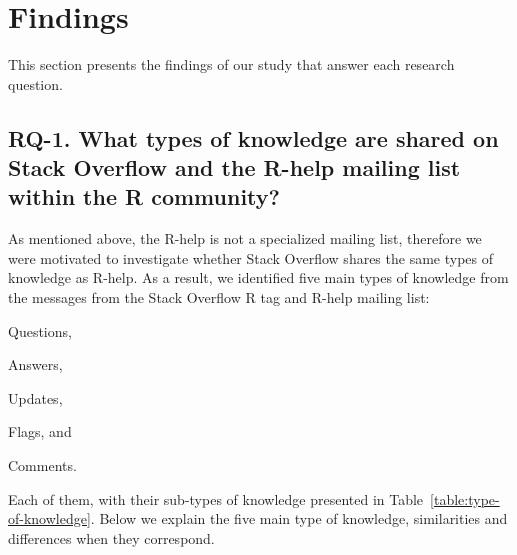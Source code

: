 \section{Findings}
\label{cha:findings}

This section presents the findings of our study that answer each research question.

\subsection{RQ-1. What types of knowledge are shared on Stack Overflow and the R-help mailing list within the R community?}
\label{cha:findings-types}

	As mentioned above, the R-help is not a specialized mailing list, therefore we were motivated to investigate whether Stack Overflow shares the same types of knowledge as R-help.
	As a result, we identified five main types of knowledge from the messages from the Stack Overflow R tag and R-help mailing list:
	\begin{enumerate*}[label=(\arabic*)]
        \item Questions,
        \item Answers,
        \item Updates,
        \item Flags, and
        \item Comments.
	\end{enumerate*}
    Each of them, with their sub-types of knowledge presented in Table~\ref{table:type-of-knowledge}.
    Below we explain the five main type of knowledge, similarities and differences when they correspond.

